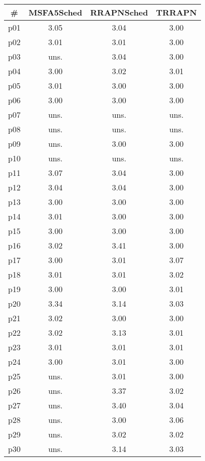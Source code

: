 \begin{tabular}{c||c|c|c}
\textbf{\#} & \textbf{MSFA5Sched} & \textbf{RRAPNSched} & \textbf{TRRAPN}\\
\hline
\hline
p01 & 3.05 & 3.04 & 3.00\\
p02 & 3.01 & 3.01 & 3.00\\
p03 & uns. & 3.04 & 3.00\\
p04 & 3.00 & 3.02 & 3.01\\
p05 & 3.01 & 3.00 & 3.00\\
p06 & 3.00 & 3.00 & 3.00\\
p07 & uns. & uns. & uns.\\
p08 & uns. & uns. & uns.\\
p09 & uns. & 3.00 & 3.00\\
p10 & uns. & uns. & uns.\\
p11 & 3.07 & 3.04 & 3.00\\
p12 & 3.04 & 3.04 & 3.00\\
p13 & 3.00 & 3.00 & 3.00\\
p14 & 3.01 & 3.00 & 3.00\\
p15 & 3.00 & 3.00 & 3.00\\
p16 & 3.02 & 3.41 & 3.00\\
p17 & 3.00 & 3.01 & 3.07\\
p18 & 3.01 & 3.01 & 3.02\\
p19 & 3.00 & 3.00 & 3.01\\
p20 & 3.34 & 3.14 & 3.03\\
p21 & 3.02 & 3.00 & 3.00\\
p22 & 3.02 & 3.13 & 3.01\\
p23 & 3.01 & 3.01 & 3.01\\
p24 & 3.00 & 3.01 & 3.00\\
p25 & uns. & 3.01 & 3.00\\
p26 & uns. & 3.37 & 3.02\\
p27 & uns. & 3.40 & 3.04\\
p28 & uns. & 3.00 & 3.06\\
p29 & uns. & 3.02 & 3.02\\
p30 & uns. & 3.14 & 3.03\\
\end{tabular}

